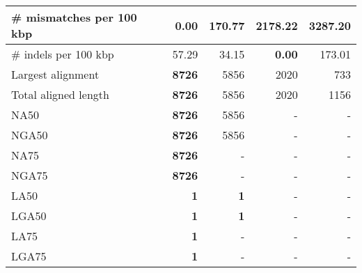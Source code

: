 \documentclass[12pt,a4paper]{article}
\begin{document}
\begin{table}[ht]
\begin{center}
\begin{tabular}{|l*{4}{|r}|}
\# mismatches per 100 kbp & {\bf 0.00} & 170.77 & 2178.22 & 3287.20 \\ \hline
\# indels per 100 kbp & 57.29 & 34.15 & {\bf 0.00} & 173.01 \\ \hline
Largest alignment & {\bf 8726} & 5856 & 2020 & 733 \\ \hline
Total aligned length & {\bf 8726} & 5856 & 2020 & 1156 \\ \hline
NA50 & {\bf 8726} & 5856 & - & - \\ \hline
NGA50 & {\bf 8726} & 5856 & - & - \\ \hline
NA75 & {\bf 8726} & - & - & - \\ \hline
NGA75 & {\bf 8726} & - & - & - \\ \hline
LA50 & {\bf 1} & {\bf 1} & - & - \\ \hline
LGA50 & {\bf 1} & {\bf 1} & - & - \\ \hline
LA75 & {\bf 1} & - & - & - \\ \hline
LGA75 & {\bf 1} & - & - & - \\ \hline
\end{tabular}
\end{center}
\end{table}
\end{document}
